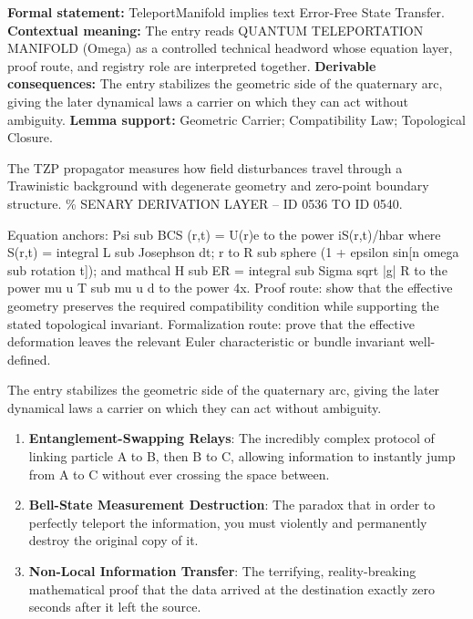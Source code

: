 \begingroup\footnotesize\setlength{\emergencystretch}{3em}\sloppy
\textbf{Formal statement:} TeleportManifold implies text Error-Free State Transfer. \textbf{Contextual meaning:} The entry reads QUANTUM TELEPORTATION MANIFOLD (Omega) as a controlled technical headword whose equation layer, proof route, and registry role are interpreted together. \textbf{Derivable consequences:} The entry stabilizes the geometric side of the quaternary arc, giving the later dynamical laws a carrier on which they can act without ambiguity. \textbf{Lemma support:} Geometric Carrier; Compatibility Law; Topological Closure.\par
\endgroup

The TZP propagator measures how field disturbances travel through a Trawinistic background with degenerate geometry and zero-point boundary structure. \% SENARY DERIVATION LAYER -- ID 0536 TO ID 0540.

Equation anchors: Psi sub BCS (r,t) = U(r)e to the power iS(r,t)/hbar where S(r,t) = integral L sub Josephson dt; r to R sub sphere (1 + epsilon sin[n omega sub rotation t]); and mathcal H sub ER = integral sub Sigma sqrt |g| R to the power mu u T sub mu u d to the power 4x. Proof route: show that the effective geometry preserves the required compatibility condition while supporting the stated topological invariant. Formalization route: prove that the effective deformation leaves the relevant Euler characteristic or bundle invariant well-defined.

The entry stabilizes the geometric side of the quaternary arc, giving the later dynamical laws a carrier on which they can act without ambiguity.
\endgroup

\begin{enumerate}[leftmargin=1.6em,itemsep=6pt,topsep=4pt]
\item \textbf{Entanglement-Swapping Relays}: The incredibly complex protocol of linking particle A to B, then B to C, allowing information to instantly jump from A to C without ever crossing the space between.
\item \textbf{Bell-State Measurement Destruction}: The paradox that in order to perfectly teleport the information, you must violently and permanently destroy the original copy of it.
\item \textbf{Non-Local Information Transfer}: The terrifying, reality-breaking mathematical proof that the data arrived at the destination exactly zero seconds after it left the source.
\end{enumerate}

